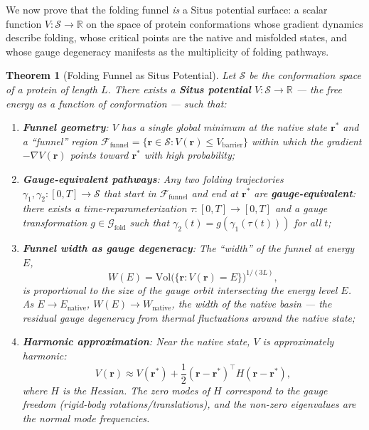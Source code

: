\documentclass[12pt,a4paper]{article}
\newtheorem{theorem}{Theorem}[section]
\theoremstyle{remark}
\newcommand{\R}{\mathbb{R}}
\newcommand{\G}{\mathcal{G}}
\newcommand{\F}{\mathcal{F}}
\newcommand{\Sstruct}{\mathcal{S}}
\begin{document}
We now prove that the folding funnel \emph{is} a Situs potential surface: a scalar function $V: \Sstruct \to \R$ on the space of protein conformations whose gradient dynamics describe folding, whose critical points are the native and misfolded states, and whose gauge degeneracy manifests as the multiplicity of folding pathways.

\begin{theorem}[Folding Funnel as Situs Potential]
\label{thm:folding-situs}
Let $\Sstruct$ be the conformation space of a protein of length $L$.
There exists a \textbf{Situs potential} $V: \Sstruct \to \R$ — the free energy as a function of conformation — such that:
\begin{enumerate}[leftmargin=*,label=(\roman*)]
    \item \textbf{Funnel geometry}: $V$ has a single global minimum at the native state $\mathbf{r}^*$ and a ``funnel'' region $\F_{\text{funnel}} = \{\mathbf{r} \in \Sstruct : V(\mathbf{r}) \leq V_{\text{barrier}}\}$ within which the gradient $-\nabla V(\mathbf{r})$ points toward $\mathbf{r}^*$ with high probability;
    \item \textbf{Gauge-equivalent pathways}: Any two folding trajectories $\gamma_1, \gamma_2: [0, T] \to \Sstruct$ that start in $\F_{\text{funnel}}$ and end at $\mathbf{r}^*$ are \textbf{gauge-equivalent}: there exists a time-reparameterization $\tau: [0, T] \to [0, T]$ and a gauge transformation $g \in \G_{\text{fold}}$ such that $\gamma_2(t) = g(\gamma_1(\tau(t)))$ for all $t$;
    \item \textbf{Funnel width as gauge degeneracy}: The ``width'' of the funnel at energy $E$,
    \begin{equation}
        W(E) = \text{Vol}\big(\{\mathbf{r} : V(\mathbf{r}) = E\}\big)^{1/(3L)},
    \end{equation}
    is proportional to the size of the gauge orbit intersecting the energy level $E$.
    As $E \to E_{\text{native}}$, $W(E) \to W_{\text{native}}$, the width of the native basin — the residual gauge degeneracy from thermal fluctuations around the native state;
    \item \textbf{Harmonic approximation}: Near the native state, $V$ is approximately harmonic:
    \begin{equation}
        V(\mathbf{r}) \approx V(\mathbf{r}^*) + \frac{1}{2}(\mathbf{r} - \mathbf{r}^*)^\top H (\mathbf{r} - \mathbf{r}^*),
    \end{equation}
    where $H$ is the Hessian. The zero modes of $H$ correspond to the gauge freedom (rigid-body rotations/translations), and the non-zero eigenvalues are the normal mode frequencies.
\end{enumerate}
\end{theorem}
\end{document}
